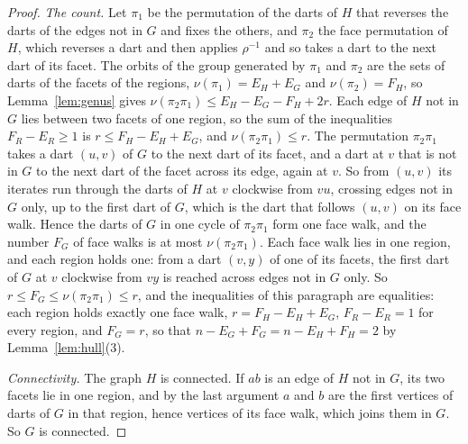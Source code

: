 \documentclass[12pt]{amsart}
\theoremstyle{definition}
\theoremstyle{plain}
\theoremstyle{definition}
\begin{document}
\begin{proof}
\emph{The count.} Let $\pi_1$ be the permutation of the darts of $H$ that reverses the darts of the edges not in $G$ and fixes the others, and $\pi_2$ the face permutation of $H$, which reverses a dart and then applies $\rho^{-1}$ and so takes a dart to the next dart of its facet. The orbits of the group generated by $\pi_1$ and $\pi_2$ are the sets of darts of the facets of the regions, $\nu(\pi_1)=E_H+E_G$ and $\nu(\pi_2)=F_H$, so Lemma~\ref{lem:genus} gives $\nu(\pi_2\pi_1)\le E_H-E_G-F_H+2r$. Each edge of $H$ not in $G$ lies between two facets of one region, so the sum of the inequalities $F_R-E_R\ge1$ is $r\le F_H-E_H+E_G$, and $\nu(\pi_2\pi_1)\le r$. The permutation $\pi_2\pi_1$ takes a dart $(u,v)$ of $G$ to the next dart of its facet, and a dart at $v$ that is not in $G$ to the next dart of the facet across its edge, again at $v$. So from $(u,v)$ its iterates run through the darts of $H$ at $v$ clockwise from $vu$, crossing edges not in $G$ only, up to the first dart of $G$, which is the dart that follows $(u,v)$ on its face walk. Hence the darts of $G$ in one cycle of $\pi_2\pi_1$ form one face walk, and the number $F_G$ of face walks is at most $\nu(\pi_2\pi_1)$. Each face walk lies in one region, and each region holds one: from a dart $(v,y)$ of one of its facets, the first dart of $G$ at $v$ clockwise from $vy$ is reached across edges not in $G$ only. So $r\le F_G\le\nu(\pi_2\pi_1)\le r$, and the inequalities of this paragraph are equalities: each region holds exactly one face walk, $r=F_H-E_H+E_G$, $F_R-E_R=1$ for every region, and $F_G=r$, so that $n-E_G+F_G=n-E_H+F_H=2$ by Lemma~\ref{lem:hull}(3).

\emph{Connectivity.} The graph $H$ is connected. If $ab$ is an edge of $H$ not in $G$, its two facets lie in one region, and by the last argument $a$ and $b$ are the first vertices of darts of $G$ in that region, hence vertices of its face walk, which joins them in $G$. So $G$ is connected.


\end{proof}
\end{document}
